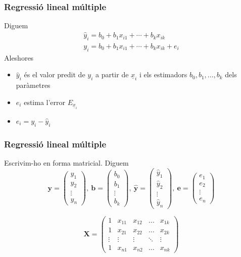 \documentclass[12pt,t]{beamer}
\theoremstyle{plain}
\theoremstyle{definition}
\begin{document}
\begin{frame}
\frametitle{Regressió lineal múltiple}
Diguem
$$
\begin{array}{l}
\widehat{y}_i=b_0+b_1 x_{i 1}+\cdots+b_{k} x_{i k}\\
y_i=b_0+b_1 x_{i 1}+\cdots+b_{k} x_{i k}+e_i
\end{array}
$$
Aleshores
\begin{itemize}
\item $\widehat{y}_i$ és el valor predit de $y_i$ a partir de $\underline{x}_{i}$ i els estimadors $b_0,b_1,\ldots,b_k$ dels paràmetres
\medskip

\item $e_i$ estima l'error $E_{\underline{x}_{i}}$
\medskip

\item $e_i=y_i-\widehat{y}_i$
\end{itemize}
\end{frame}

\begin{frame}
\frametitle{Regressió lineal múltiple}
Escrivim-ho en forma matricial. Diguem
$$
\mathbf{y}=
\left(
\begin{array}{l}
y_1\\ y_2\\ \vdots\\ y_n
\end{array}
\right),\ \mathbf{b}=\left(
\begin{array}{l}
b_0\\ b_1 \\ \vdots\\b_k
\end{array}
\right),\ \mathbf{\widehat{y}}=\left(
\begin{array}{l}
\widehat{y}_1\\ \widehat{y}_2\\ \vdots\\\widehat{y}_n
\end{array}
\right),\ \mathbf{e}=\left(
\begin{array}{l}
e_1\\ e_2\\ \vdots\\ e_n
\end{array}
\right)
$$
\medskip

$$
\mathbf{X}=\left(
\begin{array}{lllll}
1&x_{11}&x_{12}&\ldots&x_{1k}\\
1&x_{21}&x_{22}&\ldots&x_{2k}\\
\vdots&\vdots&\vdots&\ddots&\vdots\\
1&x_{n1}&x_{n2}&\ldots&x_{nk}
\end{array}
\right)$$
\end{frame}
\end{document}

